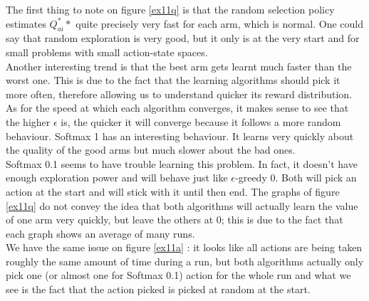 \documentclass[a4paper]{article}
\begin{document}
The first thing to note on figure \ref{ex11q} is that the random selection 
policy estimates $Q^*_{ai}*$ quite precisely very fast for each arm, which is
normal. One could say that random exploration is very good, but it only is at
the very start and for small problems with small action-state spaces.\\

Another interesting trend is that the best arm gets learnt much faster than the
worst one. This is due to the fact that the learning algorithms should pick it
more often, therefore allowing us to understand quicker its reward
distribution.\\

As for the speed at which each algorithm converges, it makes sense to see that
the higher $\epsilon$ is, the quicker it will converge because it follows a
more random behaviour. Softmax 1 has an interesting behaviour. It learns
very quickly about the quality of the good arms but much slower about the bad
ones.\\

Softmax 0.1 seems to have trouble learning this problem. In fact, it doesn't
have enough exploration power and will behave just like $\epsilon$-greedy 0.
Both will pick an action at the start and will stick with it until then end.
The graphs of figure \ref{ex11q} do not convey the idea that both algorithms
will actually learn the value of one arm very quickly, but leave the others at
0; this is due to the fact that each graph shows an average of many runs.\\

We have the same issue on figure \ref{ex11a} : it looks like all actions are
being taken roughly the same amount of time during a run, but both algorithms
actually only pick one (or almost one for Softmax 0.1) action for the whole run
and what we see is the fact that the action picked is picked at random at the 
start.
\end{document}
